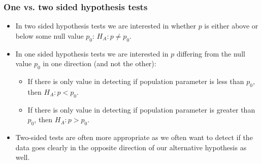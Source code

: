 \begin{frame}
\frametitle{One vs. two sided hypothesis tests}
 
\begin{itemize}
 
\item In two sided hypothesis tests we are interested in whether $p$ is either above or below some null value $p_0$: $H_A: p \ne p_0$.
 
\item In one sided hypothesis tests we are interested in $p$ differing from the null value $p_0$ in one direction (and not the other):
\begin{itemize}
\item If there is only value in detecting if population parameter is less than $p_0$, then $H_A: p < p_0$.
\item If there is only value in detecting if population parameter is greater than $p_0$, then $H_A: p > p_0$.
\end{itemize}

\item Two-sided tests are often more appropriate as we often want to detect if the data goes clearly in the opposite direction of our alternative hypothesis as well.

\end{itemize}

\end{frame}

 